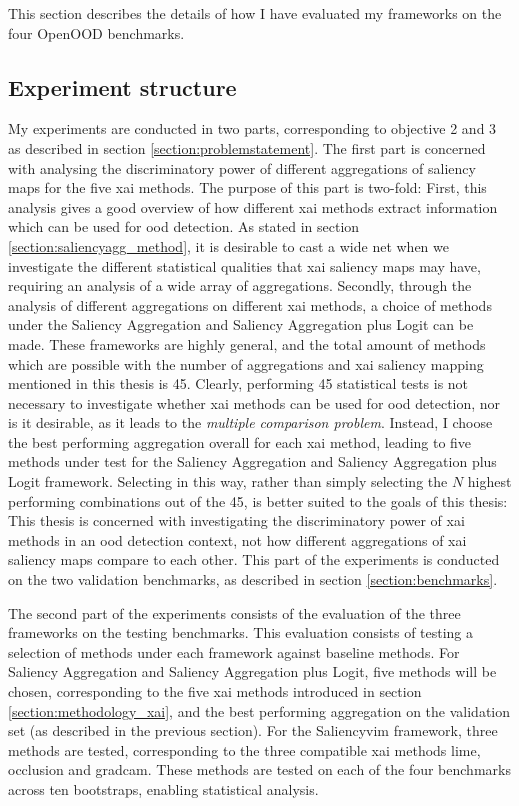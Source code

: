 \documentclass[UKenglish]{uiomasterthesis} %
\theoremstyle{definition}
\begin{document}
This section describes the details of how I have evaluated my frameworks on the four OpenOOD benchmarks.

\subsection{Experiment structure}

My experiments are conducted in two parts, corresponding to objective 2 and 3 as described in section \ref{section:problemstatement}. The first part is concerned with analysing the discriminatory power of different aggregations of saliency maps for the five \ac{xai} methods. The purpose of this part is two-fold: First, this analysis gives a good overview of how different \ac{xai} methods extract information which can be used for \ac{ood} detection. As stated in section \ref{section:saliencyagg_method}, it is desirable to cast a wide net when we investigate the different statistical qualities that \ac{xai} saliency maps may have, requiring an analysis of a wide array of aggregations. Secondly, through the analysis of different aggregations on different \ac{xai} methods, a choice of methods under the Saliency Aggregation and Saliency Aggregation plus Logit can be made. These frameworks are highly general, and the total amount of methods which are possible with the number of aggregations and \ac{xai} saliency mapping mentioned in this thesis is 45. Clearly, performing 45 statistical tests is not necessary to investigate whether \ac{xai} methods can be used for \ac{ood} detection, nor is it desirable, as it leads to the {\it multiple comparison problem}. Instead, I choose the best performing aggregation overall for each \ac{xai} method, leading to five methods under test for the Saliency Aggregation and Saliency Aggregation plus Logit framework. Selecting in this way, rather than simply selecting the $N$ highest performing combinations out of the 45, is better suited to the goals of this thesis: This thesis is concerned with investigating the discriminatory power of \ac{xai} methods in an \ac{ood} detection context, not how different aggregations of \ac{xai} saliency maps compare to each other. This part of the experiments is conducted on the two validation benchmarks, as described in section \ref{section:benchmarks}.

The second part of the experiments consists of the evaluation of the three frameworks on the testing benchmarks. This evaluation consists of testing a selection of methods under each framework against baseline methods. For Saliency Aggregation and Saliency Aggregation plus Logit, five methods will be chosen, corresponding to the five \ac{xai} methods introduced in section \ref{section:methodology_xai}, and the best performing aggregation on the validation set (as described in the previous section). For the Saliency\ac{vim} framework, three methods are tested, corresponding to the three compatible \ac{xai} methods \ac{lime}, occlusion and \ac{gradcam}. These methods are tested on each of the four benchmarks across ten bootstraps, enabling statistical analysis.
\end{document}

